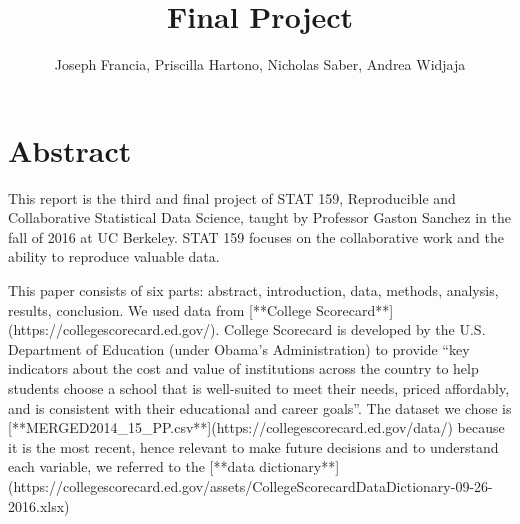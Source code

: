 \documentclass{article}
\begin{document}


\title{Final Project}
\author{Joseph Francia, Priscilla Hartono, Nicholas Saber, Andrea Widjaja}

\maketitle
\section{Abstract}
This report is the third and final project of STAT 159, Reproducible and Collaborative Statistical Data Science, taught by Professor Gaston Sanchez in the fall of 2016 at UC Berkeley. STAT 159 focuses on the collaborative work and the ability to reproduce valuable data.

This paper consists of six parts: abstract, introduction, data, methods, analysis, results, conclusion. We used data from [**College Scorecard**](https://collegescorecard.ed.gov/). College Scorecard is developed by the U.S. Department of Education (under Obama’s Administration) to provide “key indicators about the cost and value of institutions across the country to help students choose a school that is well-suited to meet their needs, priced affordably, and is consistent with their educational and career goals”. The dataset we chose is [**MERGED2014_15_PP.csv**](https://collegescorecard.ed.gov/data/) because it is the most recent, hence relevant to make future decisions and to understand each variable, we referred to the [**data dictionary**](https://collegescorecard.ed.gov/assets/CollegeScorecardDataDictionary-09-26-2016.xlsx)
\end{document}
